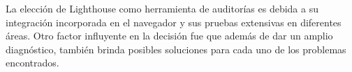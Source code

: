 
La elección de Lighthouse como herramienta de auditorías es debida a su integración incorporada en el navegador y sus pruebas extensivas en diferentes áreas. Otro factor influyente en la decisión fue que además de dar un amplio diagnóstico, también brinda posibles soluciones para cada uno de los problemas encontrados.

